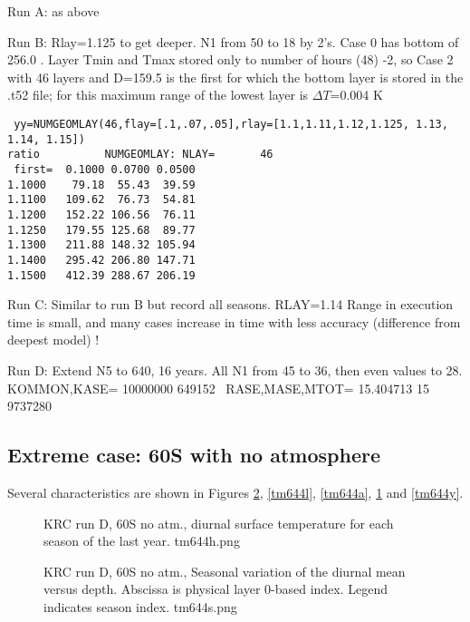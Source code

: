 \documentclass{article}
\begin{document}
Run A: as above

Run B:  Rlay=1.125 to get deeper. N1 from 50 to 18 by 2's. Case 0 has bottom of  256.0 . Layer Tmin and Tmax stored only to number of hours (48) -2, so Case 2 with 46 layers and D=159.5 is the first for which the bottom layer is stored in the .t52 file; for this maximum range of the lowest layer is $\Delta T$=0.004 K
\vspace{-3.mm} 
\begin{verbatim}
 yy=NUMGEOMLAY(46,flay=[.1,.07,.05],rlay=[1.1,1.11,1.12,1.125, 1.13, 1.14, 1.15]) 
ratio          NUMGEOMLAY: NLAY=       46
 first=  0.1000 0.0700 0.0500
1.1000    79.18  55.43  39.59
1.1100   109.62  76.73  54.81
1.1200   152.22 106.56  76.11
1.1250   179.55 125.68  89.77
1.1300   211.88 148.32 105.94
1.1400   295.42 206.80 147.71
1.1500   412.39 288.67 206.19
\end{verbatim} 

Run C: Similar to run B but record all seasons. RLAY=1.14  Range in execution time is small, and many cases increase in time with less accuracy (difference from deepest model) !

Run D: Extend N5 to 640, 16 years. All N1 from 45 to 36, then even values to 28.
\\  KOMMON,KASE=  10000000  649152  \ RASE,MASE,MTOT=   15.404713    15     9737280


\subsection{Extreme case: 60\qd S with no atmosphere}

 Several characteristics are shown in Figures  \ref{tm644s}, \ref{tm644l}, \ref{tm644a}, \ref{tm644h} and \ref{tm644y}.

\begin{figure}[!ht] 
\caption[60S no atm., diurnal surface temperature]{KRC run D, 60S no atm.,
  diurnal surface temperature for each season of the last year.
\label{tm644h}  tm644h.png }
\end{figure} 

\begin{figure}[!ht] 
\caption[60S no atm., Seasonal T vers depth ]{KRC run D, 60S no atm., Seasonal
  variation of the diurnal mean versus depth. Abscissa is physical layer 0-based
  index. Legend indicates season index.
\label{tm644s} tm644s.png  }
\end{figure} 
\end{document}
